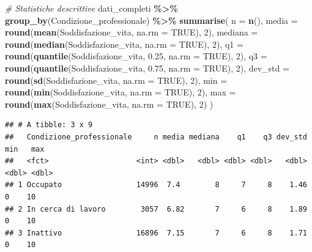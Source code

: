 \documentclass[
]{article}
\newenvironment{Shaded}{\begin{snugshade}}{\end{snugshade}}
\newcommand{\AttributeTok}[1]{\textcolor[rgb]{0.13,0.29,0.53}{#1}}
\newcommand{\CommentTok}[1]{\textcolor[rgb]{0.56,0.35,0.01}{\textit{#1}}}
\newcommand{\ConstantTok}[1]{\textcolor[rgb]{0.56,0.35,0.01}{#1}}
\newcommand{\DecValTok}[1]{\textcolor[rgb]{0.00,0.00,0.81}{#1}}
\newcommand{\FloatTok}[1]{\textcolor[rgb]{0.00,0.00,0.81}{#1}}
\newcommand{\FunctionTok}[1]{\textcolor[rgb]{0.13,0.29,0.53}{\textbf{#1}}}
\newcommand{\NormalTok}[1]{#1}
\newcommand{\SpecialCharTok}[1]{\textcolor[rgb]{0.81,0.36,0.00}{\textbf{#1}}}
\begin{document}
\begin{Shaded}
\begin{Highlighting}[]
\CommentTok{\# Statistiche descrittive }
\NormalTok{dati\_completi }\SpecialCharTok{\%\textgreater{}\%}
  \FunctionTok{group\_by}\NormalTok{(Condizione\_professionale) }\SpecialCharTok{\%\textgreater{}\%}
  \FunctionTok{summarise}\NormalTok{(}
    \AttributeTok{n =} \FunctionTok{n}\NormalTok{(),}
    \AttributeTok{media =} \FunctionTok{round}\NormalTok{(}\FunctionTok{mean}\NormalTok{(Soddisfazione\_vita, }\AttributeTok{na.rm =} \ConstantTok{TRUE}\NormalTok{), }\DecValTok{2}\NormalTok{),}
    \AttributeTok{mediana =} \FunctionTok{round}\NormalTok{(}\FunctionTok{median}\NormalTok{(Soddisfazione\_vita, }\AttributeTok{na.rm =} \ConstantTok{TRUE}\NormalTok{), }\DecValTok{2}\NormalTok{),}
    \AttributeTok{q1 =} \FunctionTok{round}\NormalTok{(}\FunctionTok{quantile}\NormalTok{(Soddisfazione\_vita, }\FloatTok{0.25}\NormalTok{, }\AttributeTok{na.rm =} \ConstantTok{TRUE}\NormalTok{), }\DecValTok{2}\NormalTok{),}
    \AttributeTok{q3 =} \FunctionTok{round}\NormalTok{(}\FunctionTok{quantile}\NormalTok{(Soddisfazione\_vita, }\FloatTok{0.75}\NormalTok{, }\AttributeTok{na.rm =} \ConstantTok{TRUE}\NormalTok{), }\DecValTok{2}\NormalTok{),}
    \AttributeTok{dev\_std =} \FunctionTok{round}\NormalTok{(}\FunctionTok{sd}\NormalTok{(Soddisfazione\_vita, }\AttributeTok{na.rm =} \ConstantTok{TRUE}\NormalTok{), }\DecValTok{2}\NormalTok{),}
    \AttributeTok{min =} \FunctionTok{round}\NormalTok{(}\FunctionTok{min}\NormalTok{(Soddisfazione\_vita, }\AttributeTok{na.rm =} \ConstantTok{TRUE}\NormalTok{), }\DecValTok{2}\NormalTok{),}
    \AttributeTok{max =} \FunctionTok{round}\NormalTok{(}\FunctionTok{max}\NormalTok{(Soddisfazione\_vita, }\AttributeTok{na.rm =} \ConstantTok{TRUE}\NormalTok{), }\DecValTok{2}\NormalTok{)}
\NormalTok{  )}
\end{Highlighting}
\end{Shaded}

\begin{verbatim}
## # A tibble: 3 x 9
##   Condizione_professionale     n media mediana    q1    q3 dev_std   min   max
##   <fct>                    <int> <dbl>   <dbl> <dbl> <dbl>   <dbl> <dbl> <dbl>
## 1 Occupato                 14996  7.4        8     7     8    1.46     0    10
## 2 In cerca di lavoro        3057  6.82       7     6     8    1.89     0    10
## 3 Inattivo                 16896  7.15       7     6     8    1.71     0    10
\end{verbatim}
\end{document}
